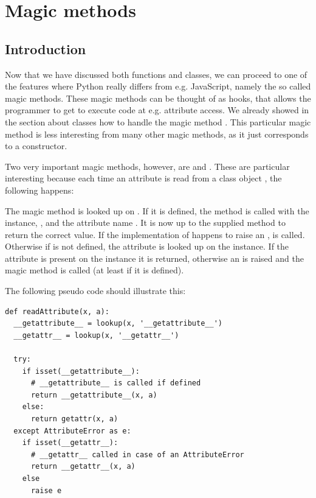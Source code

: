 \chapter{Magic methods}
\section{Introduction}
Now that we have discussed both functions and classes, we can proceed to one of the features where Python really differs from e.g. JavaScript, namely the so called magic methods. These magic methods can be thought of as hooks, that allows the programmer to get to execute code at e.g. attribute access. We already showed in the section about classes how to handle the magic method . This particular magic method is less interesting from many other magic methods, as it just corresponds to a constructor.

Two very important magic methods, however, are  and . These are particular interesting because each time an attribute  is read from a class object , the following happens:

The magic method  is looked up on . If it is defined, the method is called with the instance, , and the attribute name . It is now up to the supplied method to return the correct value. If the implementation of  happens to raise an ,  is called. Otherwise if  is not defined, the attribute is looked up on the instance. If the attribute is present on the instance it is returned, otherwise an  is raised and the magic method  is called (at least if it is defined).

The following pseudo code should illustrate this:

\begin{listing}[H]
	\begin{verbatim}
def readAttribute(x, a):
  __getattribute__ = lookup(x, '__getattribute__')
  __getattr__ = lookup(x, '__getattr__')

  try:
    if isset(__getattribute__):
      # __getattribute__ is called if defined
      return __getattribute__(x, a)
    else:
      return getattr(x, a)
  except AttributeError as e:
    if isset(__getattr__):
      # __getattr__ called in case of an AttributeError
      return __getattr__(x, a)
    else
      raise e
	\end{verbatim}
\end{listing}


